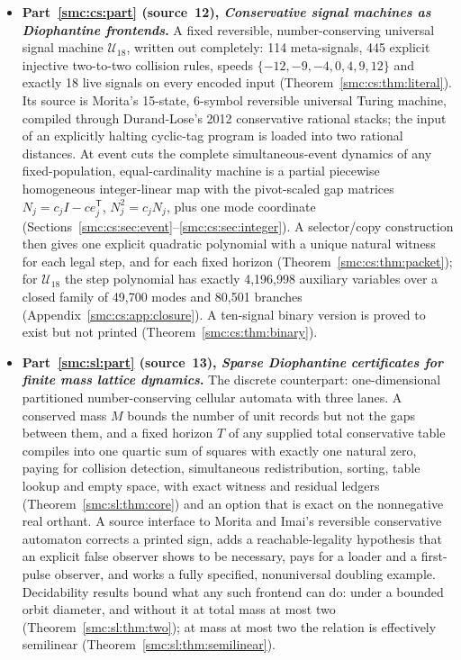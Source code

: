 \documentclass[11pt,letterpaper]{article}
\numberwithin{equation}{section}
\theoremstyle{definition}
\theoremstyle{remark}
\begin{document}
\begin{itemize}
\item \textbf{Part~\ref{smc:cs:part} (source~12), \emph{Conservative signal machines as Diophantine frontends}.} A fixed reversible, number-conserving universal signal machine $\mathcal U_{18}$, written out completely: 114 meta-signals, 445 explicit injective two-to-two collision rules, speeds $\{-12,-9,-4,0,4,9,12\}$ and exactly 18 live signals on every encoded input (Theorem~\ref{smc:cs:thm:literal}). Its source is Morita's 15-state, 6-symbol reversible universal Turing machine, compiled through Durand-Lose's 2012 conservative rational stacks; the input of an explicitly halting cyclic-tag program is loaded into two rational distances. At event cuts the complete simultaneous-event dynamics of any fixed-population, equal-cardinality machine is a partial piecewise homogeneous integer-linear map with the pivot-scaled gap matrices $N_j=c_jI-ce_j^{\mathsf T}$, $N_j^2=c_jN_j$, plus one mode coordinate (Sections~\ref{smc:cs:sec:event}--\ref{smc:cs:sec:integer}). A selector/copy construction then gives one explicit quadratic polynomial with a unique natural witness for each legal step, and for each fixed horizon (Theorem~\ref{smc:cs:thm:packet}); for $\mathcal U_{18}$ the step polynomial has exactly 4,196,998 auxiliary variables over a closed family of 49,700 modes and 80,501 branches (Appendix~\ref{smc:cs:app:closure}). A ten-signal binary version is proved to exist but not printed (Theorem~\ref{smc:cs:thm:binary}).
\item \textbf{Part~\ref{smc:sl:part} (source~13), \emph{Sparse Diophantine certificates for finite mass lattice dynamics}.} The discrete counterpart: one-dimensional partitioned number-conserving cellular automata with three lanes. A conserved mass $M$ bounds the number of unit records but not the gaps between them, and a fixed horizon $T$ of any supplied total conservative table compiles into one quartic sum of squares with exactly one natural zero, paying for collision detection, simultaneous redistribution, sorting, table lookup and empty space, with exact witness and residual ledgers (Theorem~\ref{smc:sl:thm:core}) and an option that is exact on the nonnegative real orthant. A source interface to Morita and Imai's reversible conservative automaton corrects a printed sign, adds a reachable-legality hypothesis that an explicit false observer shows to be necessary, pays for a loader and a first-pulse observer, and works a fully specified, nonuniversal doubling example. Decidability results bound what any such frontend can do: under a bounded orbit diameter, and without it at total mass at most two (Theorem~\ref{smc:sl:thm:two}); at mass at most two the relation is effectively semilinear (Theorem~\ref{smc:sl:thm:semilinear}).
\end{itemize}
\end{document}
